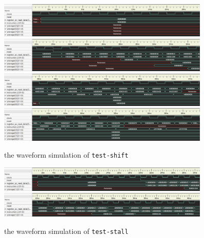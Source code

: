 \documentclass{article}
\begin{document}
\begin{figure}[!h]
\begin{center}
\includegraphics[width=0.9\textwidth]{image/test-shift-1}
\includegraphics[width=0.9\textwidth]{image/test-shift-2}
\includegraphics[width=0.9\textwidth]{image/test-shift-3}
\includegraphics[width=0.9\textwidth]{image/test-shift-4}
\caption{the waveform simulation of \texttt{test-shift}}
\end{center}
\end{figure}

\begin{figure}[!h]
\begin{center}
\includegraphics[width=0.9\textwidth]{image/test-stall-1}
\includegraphics[width=0.9\textwidth]{image/test-stall-2}
\caption{the waveform simulation of \texttt{test-stall}}
\end{center}
\end{figure}
\end{document}
